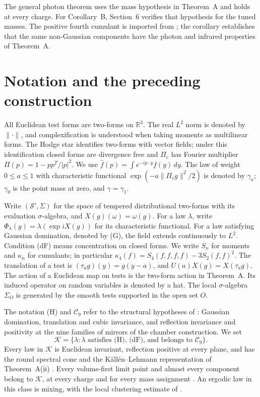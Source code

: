 \documentclass[11pt,letterpaper,reqno]{amsart}
\theoremstyle{definition}
\begin{document}
The general photon theorem uses the mass hypothesis in Theorem~A and
holds at every charge. For Corollary~B, Section~6 verifies that
hypothesis for the tuned masses. The positive fourth cumulant is
imported from \cite[Theorem~44]{QEDIII}; the corollary establishes that
the same non-Gaussian components have the photon and infrared
properties of Theorem~A.

\section*{Notation and the preceding construction}
All Euclidean test forms are two-forms on $\mathbb R^3$.
The real $L^2$ norm is denoted by $\|\cdot\|$, and complexification is
understood when taking moments as multilinear forms.
The Hodge star identifies two-forms with vector fields; under this
identification closed forms are divergence free and
$\Pi_{\mathrm c}$ has Fourier multiplier $\Pi(p)=1-pp^T/|p|^2$.
We use $\hat f(p)=\int e^{-ip\cdot y}f(y)\,dy$.
The law of weight $0\le a\le1$ with characteristic functional
$\exp(-a\|\Pi_{\mathrm c}g\|^2/2)$ is denoted by $\gamma_a$;
$\gamma_0$ is the point mass at zero, and $\gamma=\gamma_1$.

Write $(\mathcal S',\Sigma)$ for the space of tempered distributional
two-forms with its evaluation $\sigma$-algebra, and $X(g)(\omega)=\omega(g)$.
For a law $\lambda$, write
$\Phi_\lambda(g)=\lambda(\exp iX(g))$ for its characteristic functional.
For a law satisfying Gaussian domination, denoted by (G), the field
extends continuously to $L^2$. Condition (dF) means concentration on
closed forms. We write $S_n$ for moments and $\kappa_n$ for cumulants;
in particular $\kappa_4(f)=S_4(f,f,f,f)-3S_2(f,f)^2$.
The translation of a test is $(\tau_ag)(y)=g(y-a)$, and
$U(a)X(g)=X(\tau_ag)$. The action of a Euclidean map on tests is the
two-form action in Theorem~A. Its induced operator on random variables
is denoted by a hat. The local $\sigma$-algebra $\Sigma_O$ is generated by
the smooth tests supported in the open set $O$.

The notation (H) and $\mathcal C_9$ refer to the structural hypotheses
of \cite[Definition~2.38]{QEDII}: Gaussian domination, translation and
cubic invariance, and reflection invariance and positivity at the nine
families of mirrors of the chamber construction. We set
\[
\mathcal K=\{\lambda:\lambda\text{ satisfies (H), (dF), and belongs to }\mathcal C_9\}.
\]
Every law in $\mathcal K$ is Euclidean invariant, reflection positive
at every plane, and has the round spectral cone and the
K\"all\'en--Lehmann representation of Theorem~A(ii)
\cite[Theorem~1.4, Part~I]{QEDII}.
Every volume-first limit point and almost every component belong to
$\mathcal K$, at every charge and for every mass assignment
\cite[Theorem~1.3]{QEDII}. An ergodic law in this class is mixing, with
the local clustering estimate of \cite[Theorem~12.39]{QEDII}.
\end{document}
